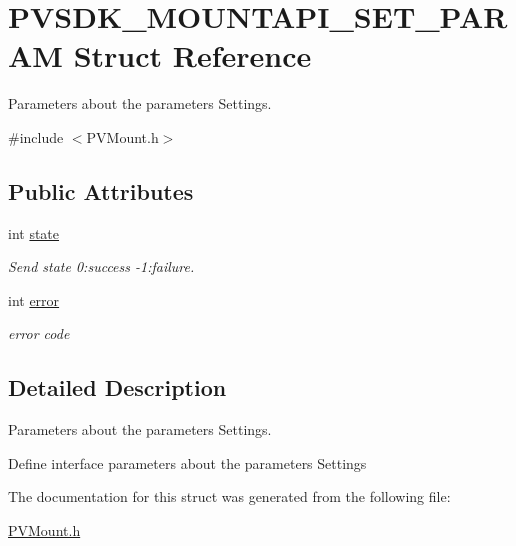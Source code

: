 \hypertarget{struct_p_v_s_d_k___m_o_u_n_t_a_p_i___s_e_t___p_a_r_a_m}{}\section{P\+V\+S\+D\+K\+\_\+\+M\+O\+U\+N\+T\+A\+P\+I\+\_\+\+S\+E\+T\+\_\+\+P\+A\+R\+AM Struct Reference}
\label{struct_p_v_s_d_k___m_o_u_n_t_a_p_i___s_e_t___p_a_r_a_m}


Parameters about the parameters Settings.  




{\ttfamily \#include $<$P\+V\+Mount.\+h$>$}

\subsection*{Public Attributes}
\begin{DoxyCompactItemize}
\item 
\mbox{\label{struct_p_v_s_d_k___m_o_u_n_t_a_p_i___s_e_t___p_a_r_a_m_a1bd6f5f734c3eca3b69a064a4aa77445}} 
int \hyperlink{struct_p_v_s_d_k___m_o_u_n_t_a_p_i___s_e_t___p_a_r_a_m_a1bd6f5f734c3eca3b69a064a4aa77445}{state}
\begin{DoxyCompactList}\small\item\em Send state 0\+:success -\/1\+:failure. \end{DoxyCompactList}\item 
\mbox{\label{struct_p_v_s_d_k___m_o_u_n_t_a_p_i___s_e_t___p_a_r_a_m_ae3e5874515c83354be6179262dcf2bad}} 
int \hyperlink{struct_p_v_s_d_k___m_o_u_n_t_a_p_i___s_e_t___p_a_r_a_m_ae3e5874515c83354be6179262dcf2bad}{error}
\begin{DoxyCompactList}\small\item\em error code \end{DoxyCompactList}\end{DoxyCompactItemize}


\subsection{Detailed Description}
Parameters about the parameters Settings. 

Define interface parameters about the parameters Settings 

The documentation for this struct was generated from the following file\+:\begin{DoxyCompactItemize}
\item 
\hyperlink{_p_v_mount_8h}{P\+V\+Mount.\+h}\end{DoxyCompactItemize}
